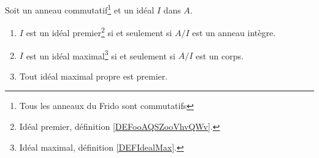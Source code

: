 \begin{proposition}      \label{PROPooRUQKooIfbnQX}
	Soit un anneau commutatif\footnote{Tous les anneaux du Frido sont commutatifs} et un idéal \( I\) dans \( A\).
	\begin{enumerate}
		\item       \label{ITEMooUGBTooOGrnWl}
		      \( I\) est un idéal premier\footnote{Idéal premier, définition \ref{DEFooAQSZooVhvQWv}.} si et seulement si \( A/I\) est un anneau intègre.
		\item   \label{ITEMooGLXSooUjINqR}
		      \( I\) est un idéal maximal\footnote{Idéal maximal, définition \ref{DEFIdealMax}.} si et seulement si \( A/I\) est un corps.
		\item       \label{ITEMooTFFQooOUajFw}
		      Tout idéal maximal propre est premier.
	\end{enumerate}
\end{proposition}

